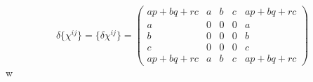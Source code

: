 \begin{equation}
\delta \{\chi^{ij}\} =  \{\delta \chi^{ij} \}
= \left(
\begin{array}{ccccc}
ap+ bq+rc & a & b & c & ap+ bq+rc \\
a & 0 & 0 & 0 & a \\
b & 0 & 0 & 0 &  b \\
c & 0 & 0 & 0 & c\\
ap+ bq+rc & a & b & c & ap+ bq+rc
\end{array}
\right)
\label{98}
\end{equation}w
